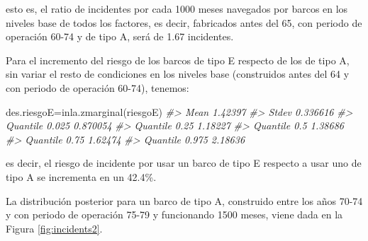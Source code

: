 \documentclass[
]{book}
\newenvironment{Shaded}{\begin{snugshade}}{\end{snugshade}}
\newcommand{\CommentTok}[1]{\textcolor[rgb]{0.56,0.35,0.01}{\textit{#1}}}
\newcommand{\FunctionTok}[1]{\textcolor[rgb]{0.00,0.00,0.00}{#1}}
\newcommand{\NormalTok}[1]{#1}
\newcommand{\OtherTok}[1]{\textcolor[rgb]{0.56,0.35,0.01}{#1}}
\begin{document}
esto es, el ratio de incidentes por cada 1000 meses navegados por barcos en los niveles base de todos los factores, es decir, fabricados antes del 65, con periodo de operación 60-74 y de tipo A, será de 1.67 incidentes.

Para el incremento del riesgo de los barcos de tipo E respecto de los de tipo A, sin variar el resto de condiciones en los niveles base (construidos antes del 64 y con periodo de operación 60-74), tenemos:

\begin{Shaded}
\begin{Highlighting}[]
\NormalTok{des.riesgoE}\OtherTok{=}\FunctionTok{inla.zmarginal}\NormalTok{(riesgoE)}
\CommentTok{\#\textgreater{} Mean            1.42397 }
\CommentTok{\#\textgreater{} Stdev           0.336616 }
\CommentTok{\#\textgreater{} Quantile  0.025 0.870054 }
\CommentTok{\#\textgreater{} Quantile  0.25  1.18227 }
\CommentTok{\#\textgreater{} Quantile  0.5   1.38686 }
\CommentTok{\#\textgreater{} Quantile  0.75  1.62474 }
\CommentTok{\#\textgreater{} Quantile  0.975 2.18636}
\end{Highlighting}
\end{Shaded}

es decir, el riesgo de incidente por usar un barco de tipo E respecto a usar uno de tipo A se incrementa en un 42.4\%.

La distribución posterior para un barco de tipo A, construido entre los años 70-74 y con periodo de operación 75-79 y funcionando 1500 meses, viene dada en la Figura \ref{fig:incidents2}.
\end{document}
